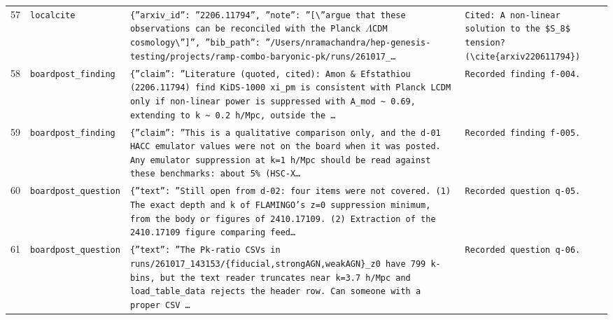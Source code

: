 \documentclass[11pt,a4paper]{article}
\begin{document}
\begin{longtable}{@{}p{}p{}p{}p{}@{}}
57 & \texttt{local}\newline\texttt{cite} & \texttt{\{''arxiv\_\allowbreak{}id'':\allowbreak{} ''2206.11794'',\allowbreak{} ''note'':\allowbreak{} ''[\textbackslash{}\allowbreak{}''argue that these observations can be reconciled with the Planck $\Lambda$CDM cosmology\textbackslash{}\allowbreak{}'']\allowbreak{}'',\allowbreak{} ''bib\_\allowbreak{}path'':\allowbreak{} ''/\allowbreak{}Users/\allowbreak{}nramachandra/\allowbreak{}hep-genesis-testing/\allowbreak{}projects/\allowbreak{}ramp-combo-baryonic-pk/\allowbreak{}runs/\allowbreak{}261017\_\allowbreak{}\ldots{}\allowbreak{}} & \texttt{Cited:\allowbreak{} A non-linear solution to the \$S\_\allowbreak{}8\$ tension? (\textbackslash{}\allowbreak{}cite\{arxiv220611794\}\allowbreak{})\allowbreak{}} \\
58 & \texttt{board}\newline\texttt{post\_\allowbreak{}finding} & \texttt{\{''claim'':\allowbreak{} ''Literature (quoted,\allowbreak{} cited)\allowbreak{}:\allowbreak{} Amon \& Efstathiou (2206.11794)\allowbreak{} find KiDS-1000 xi\_\allowbreak{}pm is consistent with Planck LCDM only if non-linear power is suppressed with A\_\allowbreak{}mod \textasciitilde{}\allowbreak{} 0.69,\allowbreak{} extending to k \textasciitilde{}\allowbreak{} 0.2 h/\allowbreak{}Mpc,\allowbreak{} outside the \ldots{}\allowbreak{}} & \texttt{Recorded finding f-004.} \\
59 & \texttt{board}\newline\texttt{post\_\allowbreak{}finding} & \texttt{\{''claim'':\allowbreak{} ''This is a qualitative comparison only,\allowbreak{} and the d-01 HACC emulator values were not on the board when it was posted. Any emulator suppression at k=\allowbreak{}1 h/\allowbreak{}Mpc should be read against these benchmarks:\allowbreak{} about 5\% (HSC-X\ldots{}\allowbreak{}} & \texttt{Recorded finding f-005.} \\
60 & \texttt{board}\newline\texttt{post\_\allowbreak{}question} & \texttt{\{''text'':\allowbreak{} ''Still open from d-02:\allowbreak{} four items were not covered. (1)\allowbreak{} The exact depth and k of FLAMINGO's z=\allowbreak{}0 suppression minimum,\allowbreak{} from the body or figures of 2410.17109. (2)\allowbreak{} Extraction of the 2410.17109 figure comparing feed\ldots{}\allowbreak{}} & \texttt{Recorded question q-05.} \\
61 & \texttt{board}\newline\texttt{post\_\allowbreak{}question} & \texttt{\{''text'':\allowbreak{} ''The Pk-ratio CSVs in runs/\allowbreak{}261017\_\allowbreak{}143153/\allowbreak{}\{fiducial,\allowbreak{}strongAGN,\allowbreak{}weakAGN\}\allowbreak{}\_\allowbreak{}z0 have 799 k-bins,\allowbreak{} but the text reader truncates near k=\allowbreak{}3.7 h/\allowbreak{}Mpc and load\_\allowbreak{}table\_\allowbreak{}data rejects the header row. Can someone with a proper CSV \ldots{}\allowbreak{}} & \texttt{Recorded question q-06.} \\

\end{longtable}
\end{document}
